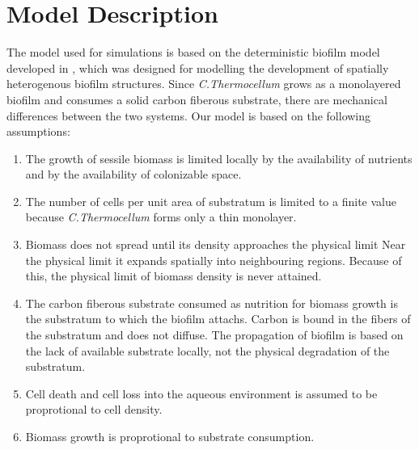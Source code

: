 \section{Model Description}
The model used for simulations is based on the deterministic biofilm model developed in \cite{eberl2001deterministic}, which was designed for modelling the development of spatially heterogenous biofilm structures.
Since \textit{C.Thermocellum} grows as a monolayered biofilm and consumes a solid carbon fiberous substrate, there are mechanical differences between the two systems.
Our model is based on the following assumptions:
\begin{enumerate}
  \item The growth of sessile biomass is limited locally by the availability of nutrients and by the availability of colonizable space.
    \label{assump:growth_inhib}
  \item The number of cells per unit area of substratum is limited to a finite value because \textit{C.Thermocellum} forms only a thin monolayer. 
    \label{assump:finite_density}
  \item Biomass does not spread until its density approaches the physical limit
    Near the physical limit it expands spatially into neighbouring regions.
    Because of this, the physical limit of biomass density is never attained.
    \label{assump:diffusion}
  \item The carbon fiberous substrate consumed as nutrition for biomass growth is the substratum to which the biofilm attachs.
    Carbon is bound in the fibers of the substratum and does not diffuse.
    The propagation of biofilm is based on the lack of available substrate locally, not the physical degradation of the substratum.
    \label{assump:substratum}
  \item Cell death and cell loss into the aqueous environment is assumed to be proprotional to cell density.
    \label{assump:bio_death}
  \item Biomass growth is proprotional to substrate consumption.
    \label{assump:sub_consumption}
\end{enumerate}

